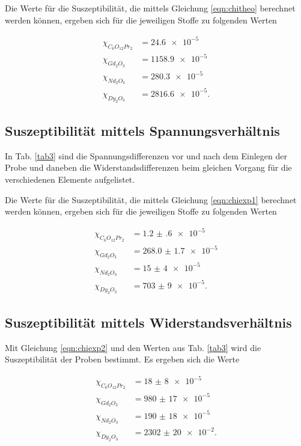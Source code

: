 
\noindent Die Werte für die Suszeptibilität, die mittels Gleichung \eqref{eqn:chitheo} berechnet werden können, ergeben sich für die jeweiligen Stoffe 
zu folgenden Werten 

\begin{align*} 
   \chi_{C_6 O_{12} Pr_2} &= \num{24.6e-5}\\
   \chi_{Gd_2 O_3} &= \num{1158.9e-5}\\
   \chi_{Nd_2 O_3} &= \num{280.3e-5}\\
   \chi_{Dy_2 O_3} &= \num{2816.6e-5}.
\end{align*}

\subsection{Suszeptibilität mittels Spannungsverhältnis}
In Tab. \ref{tab3} sind die Spannungsdifferenzen vor und nach dem Einlegen der Probe und daneben die Widerstandsdifferenzen beim gleichen Vorgang für die verschiedenen Elemente aufgelistet.


\noindent Die Werte für die Suszeptibilität, die mittels Gleichung \eqref{eqn:chiexp1} berechnet werden können, ergeben sich für die jeweiligen Stoffe 
zu folgenden Werten 

\begin{align*} 
   \chi_{C_6 O_{12} Pr_2} &= \num{1.2(6)e-5}\\
   \chi_{Gd_2 O_3} &= \num{268.0(17)e-5}\\
   \chi_{Nd_2 O_3} &= \num{15(4)e-5}\\
   \chi_{Dy_2 O_3} &= \num{703(9)e-5}.
\end{align*}


\subsection{Suszeptibilität mittels Widerstandsverhältnis}
Mit Gleichung \eqref{eqn:chiexp2} und den Werten aus Tab. \ref{tab3}
wird die Suszeptibilität der Proben bestimmt.
Es ergeben sich die Werte

\begin{align*} 
   \chi_{C_6 O_{12} Pr_2} &= \num{18(8)e-5}\\
   \chi_{Gd_2 O_3} &= \num{980(17)e-5}\\
   \chi_{Nd_2 O_3} &= \num{190(18)e-5}\\
   \chi_{Dy_2 O_3} &= \num{2302(20)e-2}.
\end{align*}